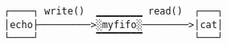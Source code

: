 \documentclass[varwidth,crop]{standalone}
\begin{document}
\begin{verbatim}
┌────┐ write()  ▁▁▁▁▁▁▁▁ read()  ┌───┐
│echo├─────────>░myfifo░────────>│cat│
└────┘          ▔▔▔▔▔▔▔▔         └───┘
\end{verbatim}
\end{document}
